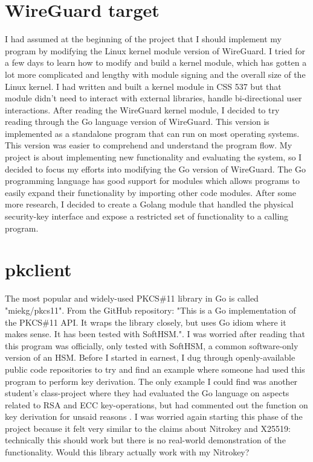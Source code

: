 \documentclass [11pt, proquest] {uwthesis}[2020/02/24]
\begin{document}
\section{WireGuard target}
I had assumed at the beginning of the project that I should implement my program by modifying the Linux kernel module version of WireGuard. I tried for a few days to learn how to modify and build a kernel module, which has gotten a lot more complicated and lengthy with module signing and the overall size of the Linux kernel. I had written and built a kernel module in CSS 537 but that module didn't need to interact with external libraries, handle bi-directional user interactions. After reading the WireGuard kernel module, I decided to try reading through the Go language version of WireGuard. This version is implemented as a standalone program that can run on most operating systems. This version was easier to comprehend and understand the program flow. My project is about implementing new functionality and evaluating the system, so I decided to focus my efforts into modifying the Go version of WireGuard.
The Go programming language has good support for modules which allows programs to easily expand their functionality by importing other code modules. After some more research, I decided to create a Golang module that handled the physical security-key interface and expose a restricted set of functionality to a calling program. 

\section{pkclient}
\label{pk_design}
The most popular and widely-used PKCS\#11 library in Go is called "miekg/pkcs11". From the GitHub repository: "This is a Go implementation of the PKCS\#11 API. It wraps the library closely, but uses Go idiom where it makes sense. It has been tested with SoftHSM."\cite{gieben_pkcs11_2022}. 
I was worried after reading that this program was officially, only tested with SoftHSM, a common software-only version of an HSM. Before I started in earnest, I dug through openly-available public code repositories to try and find an example where someone had used this program to perform key derivation. The only example I could find was another student's class-project where they had evaluated the Go language on aspects related to RSA and ECC key-operations, but had commented out the function on key derivation for unsaid reasons \cite{quapka_go-analysis_2019}. I was worried again starting this phase of the project because it felt very similar to the claims about Nitrokey and X25519: technically this should work but there is no real-world demonstration of the functionality. Would this library actually work with my Nitrokey?
\end{document}
